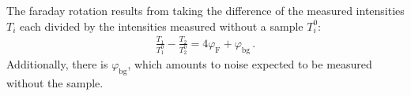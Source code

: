   The faraday rotation results from taking the difference of the measured intensities $T_i$ each divided by the intensities measured without a sample $T_i^0$:
	\begin{align*}
		\frac{T_1}{T_1^0} - \frac{T_2}{T_2^0} = 4 \varphi_\text{F} + \varphi_\text{bg} \,.
	\end{align*}
	Additionally, there is $\varphi_\text{bg}$, which amounts to noise expected to be measured without the sample.
